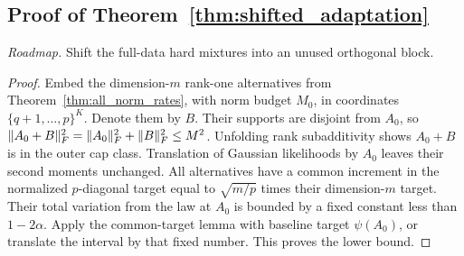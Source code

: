 \subsection{Proof of Theorem~\ref{thm:shifted_adaptation}}
\noindent\emph{Roadmap.} Shift the full-data hard mixtures into an unused orthogonal block.
\begin{proof}
Embed the dimension-$m$ rank-one alternatives from Theorem~\ref{thm:all_norm_rates}, with norm budget $M_0$, in coordinates $\{q+1,\ldots,p\}^K$. Denote them by $B$. Their supports are disjoint from $A_0$, so
$\lVert A_0+B\rVert_F^2=\lVert A_0\rVert_F^2+\lVert B\rVert_F^2\le M^2$.
Unfolding rank subadditivity shows $A_0+B$ is in the outer cap class. Translation of Gaussian likelihoods by $A_0$ leaves their second moments unchanged. All alternatives have a common increment in the normalized $p$-diagonal target equal to $\sqrt{m/p}$ times their dimension-$m$ target. Their total variation from the law at $A_0$ is bounded by a fixed constant less than $1-2\alpha$. Apply the common-target lemma with baseline target $\psi(A_0)$, or translate the interval by that fixed number. This proves the lower bound.
\end{proof}

